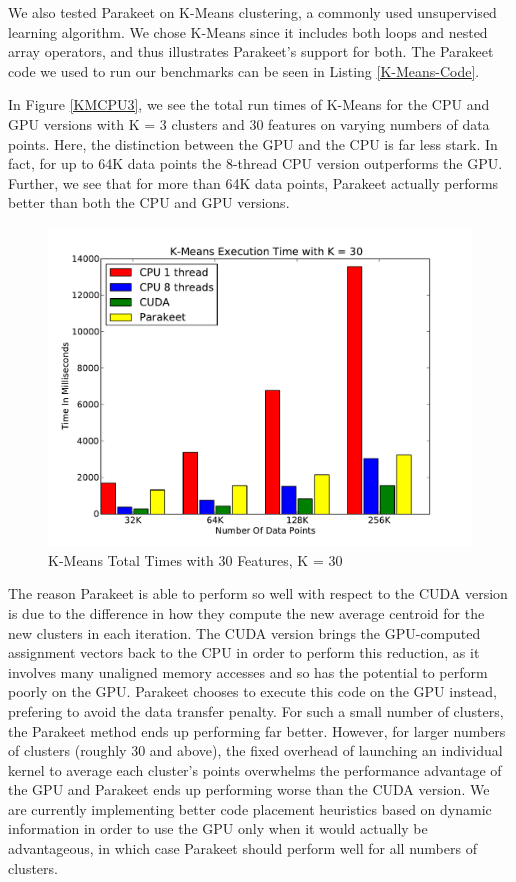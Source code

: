 \documentclass[10pt,twocolumn]{article}
\begin{document}
We also tested Parakeet on K-Means clustering, a commonly used unsupervised learning algorithm.  We chose K-Means since it includes both loops and nested array operators, and thus illustrates Parakeet's support for both.  The Parakeet code we used to run our benchmarks can be seen in Listing \ref{K-Means-Code}.

In Figure \ref{KMCPU3}, we see the total run times of K-Means for the CPU and GPU versions with K = 3 clusters and 30 features on varying numbers of data points.  Here, the distinction between the GPU and the CPU is far less stark.  In fact, for up to 64K data points the 8-thread CPU version outperforms the GPU.  Further, we see that for more than 64K data points, Parakeet actually performs better than both the CPU and GPU versions.

\begin{figure}[h!]
\includegraphics[scale=0.4]{KMCPUK30.pdf}
\caption{K-Means Total Times with 30 Features, K = 30}
\label{KMCPU30}
\end{figure}

The reason Parakeet is able to perform so well with respect to the CUDA version is due to the difference in how they compute the new average centroid for the new clusters in each iteration.  The CUDA version brings the GPU-computed assignment vectors back to the CPU in order to perform this reduction, as it involves many unaligned memory accesses and so has the potential to perform poorly on the GPU.  Parakeet chooses to execute this code on the GPU instead, prefering to avoid the data transfer penalty.  For such a small number of clusters, the Parakeet method ends up performing far better.  However, for larger numbers of clusters (roughly 30 and above), the fixed overhead of launching an individual kernel to average each cluster's points overwhelms the performance advantage of the GPU and Parakeet ends up performing worse than the CUDA version.  We are currently implementing better code placement heuristics based on dynamic information in order to use the GPU only when it would actually be advantageous, in which case Parakeet should perform well for all numbers of clusters.
\end{document}
